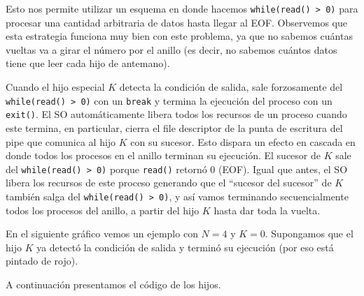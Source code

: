 
Esto nos permite utilizar un esquema en donde hacemos \texttt{while(read() > 0)} para procesar una cantidad arbitraria de datos hasta llegar al EOF. Observemos que esta estrategia funciona muy bien con este problema, ya que no sabemos cuántas vueltas va a girar el número por el anillo (es decir, no sabemos cuántos datos tiene que leer cada hijo de antemano).

Cuando el hijo especial $K$ detecta la condición de salida, sale forzosamente del \texttt{while(read() > 0)} con un \texttt{break} y termina la ejecución del proceso con un \texttt{exit()}. El SO automáticamente libera todos los recursos de un proceso cuando este termina, en particular, cierra el file descriptor de la punta de escritura del pipe que comunica al hijo $K$ con su sucesor. Esto dispara un efecto en cascada en donde todos los procesos en el anillo terminan su ejecución. El sucesor de $K$ sale del \texttt{while(read() > 0)} porque \texttt{read()} retornó 0 (EOF). Igual que antes, el SO libera los recursos de este proceso generando que el ``sucesor del sucesor'' de $K$ también salga del \texttt{while(read() > 0)}, y así vamos terminando secuencialmente todos los procesos del anillo, a partir del hijo $K$ hasta dar toda la vuelta.

En el siguiente gráfico vemos un ejemplo con $N = 4$ y $K = 0$. Supongamos que el hijo $K$ ya detectó la condición de salida y terminó su ejecución (por eso está pintado de rojo).



A continuación presentamos el código de los hijos.


